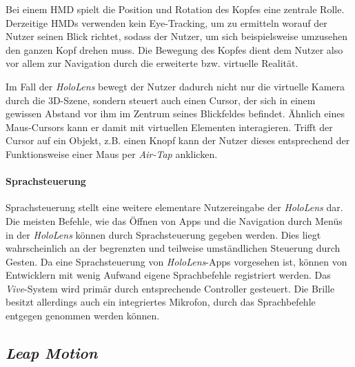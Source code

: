 Bei einem HMD spielt die Position und Rotation des Kopfes eine zentrale Rolle. 
Derzeitige HMDs verwenden kein Eye-Tracking, um zu ermitteln worauf der Nutzer seinen Blick richtet, sodass der Nutzer, um sich beispielsweise umzusehen den ganzen Kopf drehen muss. Die Bewegung des Kopfes dient dem Nutzer also vor allem zur Navigation durch die erweiterte bzw. virtuelle Realität. 

Im Fall der \textit{HoloLens} bewegt der Nutzer dadurch nicht nur die virtuelle Kamera durch die 3D-Szene, sondern steuert auch einen Cursor, der sich in einem gewissen Abstand vor ihm im Zentrum seines Blickfeldes befindet. Ähnlich eines Maus-Cursors kann er damit mit virtuellen Elementen interagieren. Trifft der Cursor auf ein Objekt, z.B. einen Knopf kann der Nutzer dieses entsprechend der Funktionsweise einer Maus per \textit{Air-Tap} anklicken. 

\paragraph{Sprachsteuerung}

Sprachsteuerung stellt eine weitere elementare Nutzereingabe der \textit{HoloLens} dar. 
Die meisten Befehle, wie das Öffnen von Apps und die Navigation durch Menüs in der \textit{HoloLens} können durch Sprachsteuerung gegeben werden. 
Dies liegt wahrscheinlich an der begrenzten und teilweise umständlichen Steuerung durch Gesten. Da eine Sprachsteuerung von \textit{HoloLens}-Apps vorgesehen ist, können von Entwicklern mit wenig Aufwand eigene Sprachbefehle registriert werden.
Das \textit{Vive}-System wird primär durch entsprechende Controller gesteuert. Die Brille besitzt allerdings auch ein integriertes Mikrofon, durch das Sprachbefehle entgegen genommen werden können.


\subsection{\textit{Leap Motion}}


